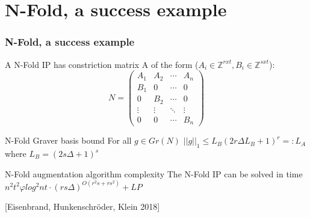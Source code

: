 \documentclass{beamer}
\begin{document}
    \section{N-Fold, a success example}
    \begin{frame}
        \frametitle{N-Fold, a success example}
        
        A N-Fold IP has constriction matrix A of the form ($A_i \in \mathbb{Z}^{rxt}, B_i \in \mathbb{Z}^{sxt}$):\\
        \begin{equation*}
        N = 
        \begin{pmatrix}
        A_1 & A_2 & \cdots & A_n \\
        B_1 & 0   & \cdots & 0 \\
        0   & B_2 & \cdots & 0 \\
        \vdots    & \vdots & \ddots & \vdots  \\
        0   & 0   & \cdots & B_n 
        \end{pmatrix}
        \end{equation*}
        
        
        \pause
        \begin{block}{N-Fold Graver basis bound}
            For all $g \in Gr(N)$ $||g||_1 \leq L_B (2r\Delta L_B + 1)^r =: L_A$ where $L_B = (2s \Delta + 1)^s$
        \end{block}
        \pause
        \begin{block}{N-Fold augmentation algorithm complexity}
            The N-Fold IP can be solved in time $n^2t^2\varphi log^2nt \cdot (rs\Delta)^{O(r^2s + rs^2)} + LP$
        \end{block}
        
        [Eisenbrand, Hunkenschröder, Klein 2018]
    \end{frame}
    
\end{document}
